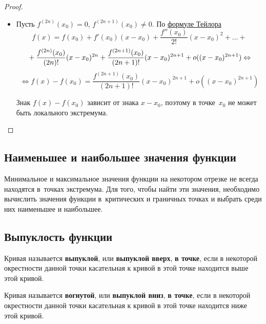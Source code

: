 \begin{enumerate}
\begin{proof}
\begin{itemize}
		\item Пусть $f^{(2n)}(x_0) = 0$, $f^{(2n+1)}(x_0) \neq 0$.
		По \hyperref[eq:Taylor_series]{формуле Тейлора}
		\begin{equation*}
		f(x) = f(x_0) + f'(x_0)(x - x_0) + \frac{f''(x_0)}{2!} (x - x_0)^2 + \ldots +
		\end{equation*}
		\begin{equation*}
		\vphantom1 + \frac{f^{(2n)}(x_0)}{(2n)!} (x - x_0)^{2n} + \frac{f^{(2n+1)}(x_0)}{(2n+1)!} (x - x_0)^{2n+1} + o((x - x_0)^{2n+1}) \Leftrightarrow
		\end{equation*}
		\begin{equation*}
		\Leftrightarrow f(x) - f(x_0) = \frac{f^{(2n+1)}(x_0)}{(2n+1)!} (x - x_0)^{2n+1} + o((x - x_0)^{2n+1})
		\end{equation*}
		
		Знак $f(x) - f(x_0)$ зависит от знака $x - x_0$, поэтому в точке~$x_0$ не может быть локального экстремума.
	\end{itemize}
	\end{proof}
\end{enumerate}

\subsection{Наименьшее и наибольшее значения функции}
Минимальное и максимальное значения функции на некотором отрезке не всегда находятся в~точках экстремума.
Для того, чтобы найти эти значения, необходимо вычислить значения функции в~критических и граничных точках и выбрать среди них наименьшее и наибольшее.

\subsection{Выпуклость функции}
Кривая называется \textbf{выпуклой}, или \textbf{выпуклой вверх}, \textbf{в точке}, если в некоторой окрестности данной точки касательная к кривой в этой точке находится выше этой кривой.

Кривая называется \textbf{вогнутой}, или \textbf{выпуклой вниз}, \textbf{в точке}, если в некоторой окрестности данной точки касательная к кривой в этой точке находится ниже этой кривой.

